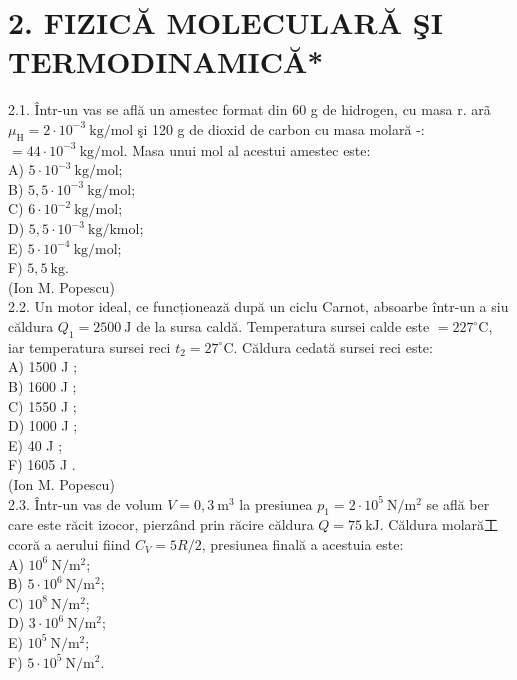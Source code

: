 \documentclass[10pt]{article}
\begin{document}
\section*{2. FIZICĂ MOLECULARĂ ŞI TERMODINAMICĂ*}
2.1. Într-un vas se află un amestec format din 60 g de hidrogen, cu masa r. arã $\mu_{\mathrm{H}}=2 \cdot 10^{-3} \mathrm{~kg} / \mathrm{mol}$ şi 120 g de dioxid de carbon cu masa molară -: $=44 \cdot 10^{-3} \mathrm{~kg} / \mathrm{mol}$. Masa unui mol al acestui amestec este:\\
A) $5 \cdot 10^{-3} \mathrm{~kg} / \mathrm{mol}$;\\
B) $5,5 \cdot 10^{-3} \mathrm{~kg} / \mathrm{mol}$;\\
C) $6 \cdot 10^{-2} \mathrm{~kg} / \mathrm{mol}$;\\
D) $5,5 \cdot 10^{-3} \mathrm{~kg} / \mathrm{kmol}$;\\
E) $5 \cdot 10^{-4} \mathrm{~kg} / \mathrm{mol}$;\\
F) $5,5 \mathrm{~kg}$.\\
(Ion M. Popescu)\\
2.2. Un motor ideal, ce funcționează după un ciclu Carnot, absoarbe într-un a siu căldura $Q_{1}=2500 \mathrm{~J}$ de la sursa caldă. Temperatura sursei calde este $=227^{\circ} \mathrm{C}$, iar temperatura sursei reci $t_{2}=27^{\circ} \mathrm{C}$. Căldura cedată sursei reci este:\\
A) 1500 J ;\\
B) 1600 J ;\\
C) 1550 J ;\\
D) 1000 J ;\\
E) 40 J ;\\
F) 1605 J .\\
(Ion M. Popescu)\\
2.3. Într-un vas de volum $V=0,3 \mathrm{~m}^{3}$ la presiunea $p_{1}=2 \cdot 10^{5} \mathrm{~N} / \mathrm{m}^{2}$ se află ber care este răcit izocor, pierzând prin răcire căldura $Q=75 \mathrm{~kJ}$. Căldura molară工ccoră a aerului fiind $C_{V}=5 R / 2$, presiunea finală a acestuia este:\\
A) $10^{6} \mathrm{~N} / \mathrm{m}^{2}$;\\
В) $5 \cdot 10^{6} \mathrm{~N} / \mathrm{m}^{2}$;\\
C) $10^{8} \mathrm{~N} / \mathrm{m}^{2}$;\\
D) $3 \cdot 10^{6} \mathrm{~N} / \mathrm{m}^{2}$;\\
E) $10^{5} \mathrm{~N} / \mathrm{m}^{2}$;\\
F) $5 \cdot 10^{5} \mathrm{~N} / \mathrm{m}^{2}$.\\
\end{document}
